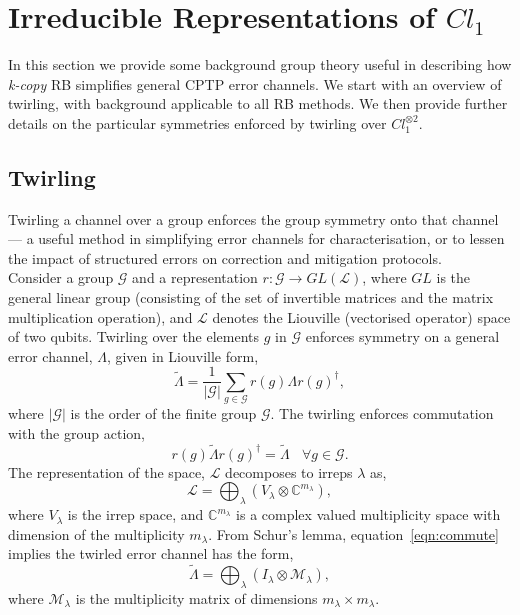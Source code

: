 \section{Irreducible Representations of $Cl_1$}
\label{app:reps}

In this section we provide some background group theory useful in describing how \emph{k-copy} RB simplifies general CPTP error channels.
We start with an overview of twirling, with background applicable to all RB methods. We then provide further details on the particular symmetries enforced by twirling over $Cl_1^{\otimes 2}$.

\subsection{Twirling}
\label{app:twirling}

Twirling a channel over a group enforces the group symmetry onto that channel --- a useful method in simplifying error channels for characterisation, or to lessen the impact of structured errors on correction and mitigation protocols.\\

Consider a group $\mathcal{G}$ and a representation $r:\mathcal{G}\rightarrow GL(\mathcal{L})$, where $GL$ is the general linear group (consisting of the set of invertible matrices and the matrix multiplication operation), and $\mathcal{L}$
denotes the Liouville (vectorised operator) space of two qubits.
Twirling over the elements $g$ in $\mathcal{G}$ enforces symmetry on a general error channel, $\Lambda$, given in Liouville form,
\begin{equation}\label{eqn:twirl}
    \tilde\Lambda=\frac{1}{\lvert\mathcal{G}\lvert}\sum_{g\in \mathcal{G}}r(g)\Lambda r(g)^\dagger,
\end{equation}
where $\lvert\mathcal{G}\lvert$ is the order of the finite group $\mathcal{G}$.
The twirling enforces commutation with the group action,
\begin{equation}\label{eqn:commute}
    r(g)\tilde\Lambda r(g)^\dagger=\tilde\Lambda~~~~\forall g \in \mathcal{G}.
\end{equation}
The representation of the space, $\mathcal{L}$ decomposes to irreps $\lambda$ as,
\begin{equation}
    \mathcal{L}=\bigoplus_\lambda(V_\lambda\otimes \mathbb{C}^{m_\lambda}),
\end{equation}
where $V_\lambda$ is the irrep space, and $\mathbb{C}^{m_\lambda}$ is a complex valued multiplicity space with dimension of the multiplicity $m_\lambda$.
From Schur's lemma, equation~\ref{eqn:commute} implies the twirled error channel has the form,
\begin{equation}\label{eqn:block-diag}
    \tilde\Lambda=\bigoplus_\lambda(I_\lambda\otimes \mathcal M_{\lambda}),
\end{equation}
where $\mathcal{M}_\lambda$ is the multiplicity matrix of dimensions $m_\lambda\times m_\lambda.$


